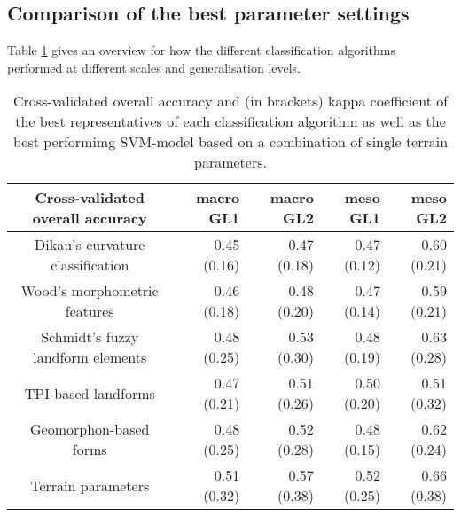 \documentclass[final,1p,times,twocolumn,authoryear]{elsarticle}
\begin{document}
\subsection{Comparison of the best parameter settings}
Table \ref{table:overall_comparison} gives an overview for how the different classification algorithms performed at different scales and generalisation levels.

\begin{table}[ht]
\caption{Cross-validated overall accuracy and (in brackets) kappa coefficient of the best representatives of each classification algorithm as well as the best performimg SVM-model based on a combination of single terrain parameters. }
\centering
\begin{tabular}{crrrr}
  \hline
Cross-validated overall accuracy & macro GL1 & macro GL2 & meso GL1 & meso GL2 \\ 
  \hline 
Dikau's curvature classification & 0.45 (0.16) & 0.47 (0.18) & 0.47 (0.12) & 0.60 (0.21) \\ 
  Wood's morphometric features & 0.46 (0.18) & 0.48 (0.20) & 0.47 (0.14) & 0.59 (0.21) \\ 
  Schmidt's fuzzy landform elements & 0.48 (0.25) & 0.53 (0.30) & 0.48 (0.19) & 0.63 (0.28) \\ 
  TPI-based landforms & 0.47 (0.21) & 0.51 (0.26) & 0.50 (0.20) & 0.51 (0.32) \\ 
  Geomorphon-based forms & 0.48 (0.25) & 0.52 (0.28) & 0.48 (0.15) & 0.62 (0.24) \\ 
  Terrain parameters & 0.51 (0.32) & 0.57 (0.38) & 0.52 (0.25) & 0.66 (0.38) \\ 
   \hline
\end{tabular}
\label{table:overall_comparison}
\end{table}
\end{document}
